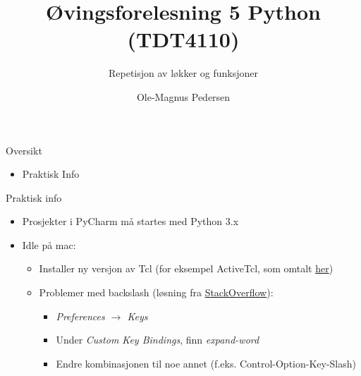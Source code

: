 \documentclass[screen, aspectratio=169]{beamer}
\title[Short title]{Øvingsforelesning 5 Python (TDT4110)}
\subtitle{Repetisjon av løkker og funksjoner}
\author[O.M. Pedersen]{Ole-Magnus Pedersen}
\institute[NTNU]{}
\date{}
\begin{document}
\begin{frame}
  \titlepage
\end{frame}


\begin{frame}{Oversikt}
  \begin{itemize}
  	\item Praktisk Info
  \end{itemize}
\end{frame}

\begin{frame}{Praktisk info}
	\begin{itemize}
		\item Prosjekter i PyCharm må startes med Python 3.x
		\item Idle på mac:
		\begin{itemize}
			\item Installer ny versjon av Tcl (for eksempel ActiveTcl, som omtalt \href{https://www.python.org/download/mac/tcltk/}{her})
			\item Problemer med backslash (løsning fra \href{https://stackoverflow.com/questions/4798930/how-do-i-make-backslash-work-in-idle}{StackOverflow}):
			\begin{itemize}
				\item \emph{Preferences $\rightarrow$ Keys}
				\item Under \emph{Custom Key Bindings}, finn \emph{expand-word}
				\item Endre kombinasjonen til noe annet (f.eks. Control-Option-Key-Slash)
			\end{itemize}
		\end{itemize}
	\end{itemize}
\end{frame}
\end{document}
